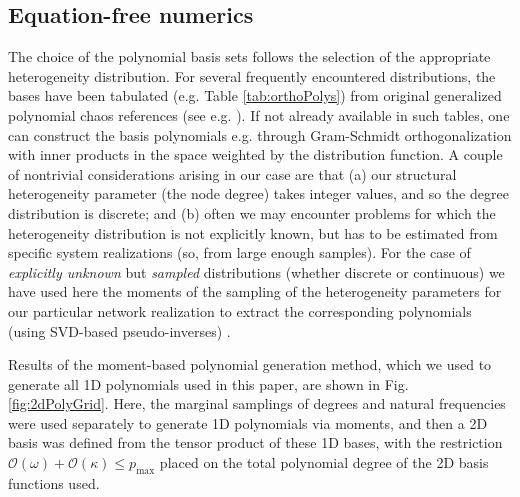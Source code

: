\documentclass[numbers]{frontiersSCNS}
\newcommand{\degree}{\kappa}
\newcommand{\figRef}[1]{Fig. \ref{fig:#1}}
\begin{document}
\subsection{Equation-free numerics}
\label{sec:polynomialGeneration}


The choice of the polynomial basis sets follows the selection of the appropriate
heterogeneity distribution.
%
For several frequently encountered distributions, the bases have been tabulated
(e.g. Table \ref{tab:orthoPolys}) from original generalized polynomial chaos
references (see e.g. \cite{Xiu2010}).
%
If not already available in such tables, one can construct the basis polynomials
e.g. through  Gram-Schmidt orthogonalization
with inner products in the space weighted by the distribution function.
%
A couple of nontrivial considerations arising in our case are that (a) our structural heterogeneity
parameter (the node degree) takes integer values, and so the degree distribution is discrete; and
(b) often we may encounter problems for which the heterogeneity distribution is not explicitly known,
but has to be estimated from specific system realizations (so, from large enough samples).
%
For the case of \emph{explicitly unknown} but \emph{sampled} distributions
(whether discrete or continuous)
we have used here the moments of the sampling of the heterogeneity parameters
for our particular network realization to extract the corresponding polynomials
(using SVD-based pseudo-inverses) \cite{Oladyshkin2012}.


Results of the moment-based polynomial generation method,
which we used to generate all 1D polynomials used in this paper,
are shown in \figRef{2dPolyGrid}.
%
Here, the marginal samplings of degrees and natural frequencies
were used separately to generate 1D polynomials via moments,
and then a 2D basis was defined from the tensor product of these 1D bases,
with the restriction $\mathcal O(\omega) + \mathcal O(\degree) \le p_\mathrm{max}$
placed on the total polynomial degree of the 2D basis functions used.
\end{document}
